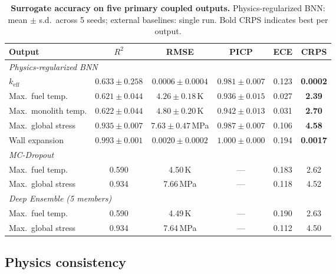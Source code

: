 \documentclass[11pt,a4paper]{article}
\newcommand{\keff}{\ensuremath{k_{\mathrm{eff}}}}
\begin{document}
\begin{table}[htbp]
\centering
\caption{\textbf{Surrogate accuracy on five primary coupled outputs.}
Physics-regularized BNN: mean $\pm$ s.d.\ across 5 seeds; external
baselines: single run. Bold CRPS indicates best per output.}
\label{tab:accuracy}
\smallskip
\small
\begin{tabular}{lccccc}
\toprule
Output & $R^2$ & RMSE & PICP & ECE & CRPS \\
\midrule
\multicolumn{6}{l}{\textit{Physics-regularized BNN}} \\
\quad \keff{}
  & $0.633 \pm 0.258$
  & $0.0006 \pm 0.0004$
  & $0.981 \pm 0.007$
  & 0.123
  & \textbf{0.0002} \\
\quad Max.\ fuel temp.
  & $0.621 \pm 0.044$
  & $4.26 \pm 0.18$\,K
  & $0.936 \pm 0.015$
  & 0.027
  & \textbf{2.39} \\
\quad Max.\ monolith temp.
  & $0.622 \pm 0.044$
  & $4.80 \pm 0.20$\,K
  & $0.942 \pm 0.013$
  & 0.031
  & \textbf{2.70} \\
\quad Max.\ global stress
  & $0.935 \pm 0.007$
  & $7.63 \pm 0.47$\,MPa
  & $0.987 \pm 0.007$
  & 0.106
  & \textbf{4.58} \\
\quad Wall expansion
  & $0.993 \pm 0.001$
  & $0.0020 \pm 0.0002$
  & $1.000 \pm 0.000$
  & 0.194
  & \textbf{0.0017} \\
\midrule
\multicolumn{6}{l}{\textit{MC-Dropout}} \\
\quad Max.\ fuel temp.
  & 0.590  & 4.50\,K  & ---  & 0.183  & 2.62 \\
\quad Max.\ global stress
  & 0.934  & 7.66\,MPa  & ---  & 0.118  & 4.52 \\
\midrule
\multicolumn{6}{l}{\textit{Deep Ensemble (5 members)}} \\
\quad Max.\ fuel temp.
  & 0.590  & 4.49\,K  & ---  & 0.190  & 2.63 \\
\quad Max.\ global stress
  & 0.934  & 7.64\,MPa  & ---  & 0.112  & 4.50 \\
\bottomrule
\end{tabular}
\end{table}


\subsection{Physics consistency}
\end{document}
